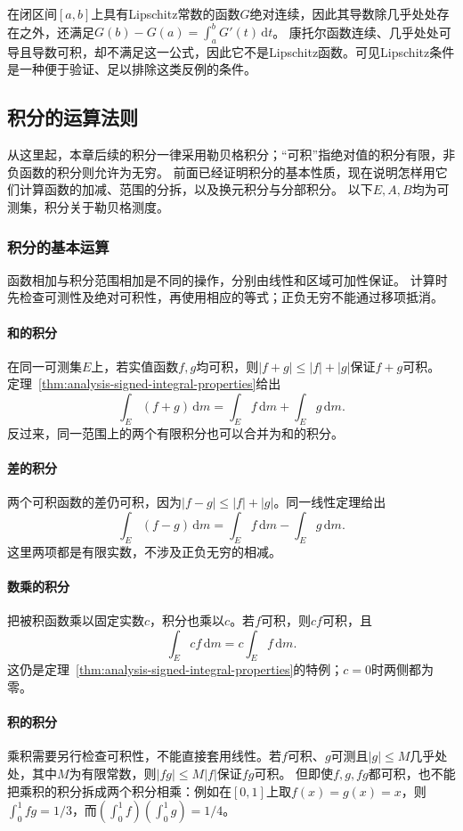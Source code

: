 在闭区间$[a,b]$上具有Lipschitz常数的函数$G$绝对连续，因此其导数除几乎处处存在之外，还满足$G(b)-G(a)=\int_a^bG'(t)\,\mathrm dt$。
康托尔函数连续、几乎处处可导且导数可积，却不满足这一公式，因此它不是Lipschitz函数。可见Lipschitz条件是一种便于验证、足以排除这类反例的条件。

\subsection{积分的运算法则}
\label{sec:analysis-integral-calculus-rules}

从这里起，本章后续的积分一律采用勒贝格积分；“可积”指绝对值的积分有限，非负函数的积分则允许为无穷。
前面已经证明积分的基本性质，现在说明怎样用它们计算函数的加减、范围的分拆，以及换元积分与分部积分。
以下$E,A,B$均为可测集，积分关于勒贝格测度。

\subsubsection{积分的基本运算}

函数相加与积分范围相加是不同的操作，分别由线性和区域可加性保证。
计算时先检查可测性及绝对可积性，再使用相应的等式；正负无穷不能通过移项抵消。

\paragraph{和的积分}
在同一可测集$E$上，若实值函数$f,g$均可积，则$|f+g|\leq|f|+|g|$保证$f+g$可积。
定理~\ref{thm:analysis-signed-integral-properties}给出
\[
 \int_E(f+g)\,\mathrm dm=\int_Ef\,\mathrm dm+\int_Eg\,\mathrm dm.
\]
反过来，同一范围上的两个有限积分也可以合并为和的积分。

\paragraph{差的积分}
两个可积函数的差仍可积，因为$|f-g|\leq|f|+|g|$。同一线性定理给出
\[
 \int_E(f-g)\,\mathrm dm=\int_Ef\,\mathrm dm-\int_Eg\,\mathrm dm.
\]
这里两项都是有限实数，不涉及正负无穷的相减。

\paragraph{数乘的积分}
把被积函数乘以固定实数$c$，积分也乘以$c$。若$f$可积，则$cf$可积，且
\[
 \int_Ecf\,\mathrm dm=c\int_Ef\,\mathrm dm.
\]
这仍是定理~\ref{thm:analysis-signed-integral-properties}的特例；$c=0$时两侧都为零。

\paragraph{积的积分}
乘积需要另行检查可积性，不能直接套用线性。若$f$可积、$g$可测且$|g|\leq M$几乎处处，其中$M$为有限常数，则$|fg|\leq M|f|$保证$fg$可积。
但即使$f,g,fg$都可积，也不能把乘积的积分拆成两个积分相乘：例如在$[0,1]$上取$f(x)=g(x)=x$，则$\int_0^1fg=1/3$，而$(\int_0^1f)(\int_0^1g)=1/4$。

